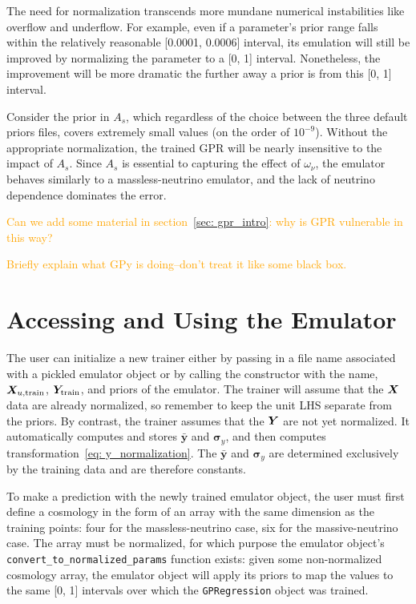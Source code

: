 The need for normalization transcends more mundane numerical instabilities
like overflow and underflow. For example, even if a parameter's 
prior range falls within the relatively reasonable [0.0001, 0.0006] interval, 
its emulation will still be improved by normalizing the parameter to a [0, 1] 
interval. Nonetheless, the improvement will be more dramatic the further away 
a prior is from this [0, 1] interval.

Consider the prior in $A_s$, which 
regardless of the choice between the three default priors files, covers 
extremely small values (on the order of $10^{-9}$). Without the appropriate 
normalization, the trained GPR will be nearly insensitive to the impact of 
$A_s$. Since $A_s$ is essential to capturing the effect of $\omega_\nu$,
the emulator behaves similarly to a massless-neutrino emulator, and the lack 
of neutrino dependence dominates the error.

\textcolor{orange}{Can we add some material in
section~\ref{sec: gpr_intro}: why is GPR vulnerable in this way?}

\textcolor{orange}{Briefly explain what GPy is doing--don’t treat it like some 
black box.}


\section{Accessing and Using the Emulator}

The user can initialize a new trainer either by
passing in a file name associated with a pickled emulator object or by
calling the constructor with the name, $\bm{X}_{u, \text{train}}$,
$\bm{Y}_\text{train}$, and priors of the emulator. The trainer will assume
that the $\bm{X}$ data are already normalized, so remember to keep the unit
LHS separate from the priors. By contrast, the trainer assumes that the
$\bm{Y}$ are not yet normalized. It automatically computes and stores
$\bar{\bm{y}}$ and $\bm{\sigma}_y$, and then computes
transformation~\ref{eq: y_normalization}.
The $\bar{\bm{y}}$ and $\bm{\sigma}_y$ are determined exclusively by the
training data and are therefore constants.

To make a prediction with the newly trained emulator object, the user must
first define a cosmology in the form of an array with the same dimension as 
the training points: four for the massless-neutrino case, six for the
massive-neutrino case. The array must be normalized, for which purpose the
emulator object's \verb|convert_to_normalized_params| function exists:
given some non-normalized cosmology array, the emulator object will apply its
priors to map the values to the same [0, 1] intervals over which the
\texttt{GPRegression} object was trained.

